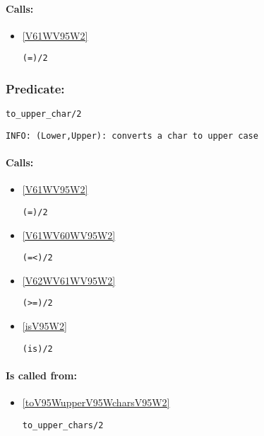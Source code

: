 \paragraph{Calls:} 
\begin{itemize}
\item \ref{V61WV95W2} 
\begin{verbatim}
(=)/2
\end{verbatim}

\end{itemize}

\subsubsection{Predicate:} \label{toV95WupperV95WcharV95W2}

\begin{verbatim}
to_upper_char/2
\end{verbatim}

{\small \begin{verbatim}
INFO: (Lower,Upper): converts a char to upper case

\end{verbatim}}
\paragraph{Calls:} 
\begin{itemize}
\item \ref{V61WV95W2} 
\begin{verbatim}
(=)/2
\end{verbatim}

\item \ref{V61WV60WV95W2} 
\begin{verbatim}
(=<)/2
\end{verbatim}

\item \ref{V62WV61WV95W2} 
\begin{verbatim}
(>=)/2
\end{verbatim}

\item \ref{isV95W2} 
\begin{verbatim}
(is)/2
\end{verbatim}

\end{itemize}
\paragraph{Is called from:} 
\begin{itemize}
\item \ref{toV95WupperV95WcharsV95W2} 
\begin{verbatim}
to_upper_chars/2
\end{verbatim}

\end{itemize}

